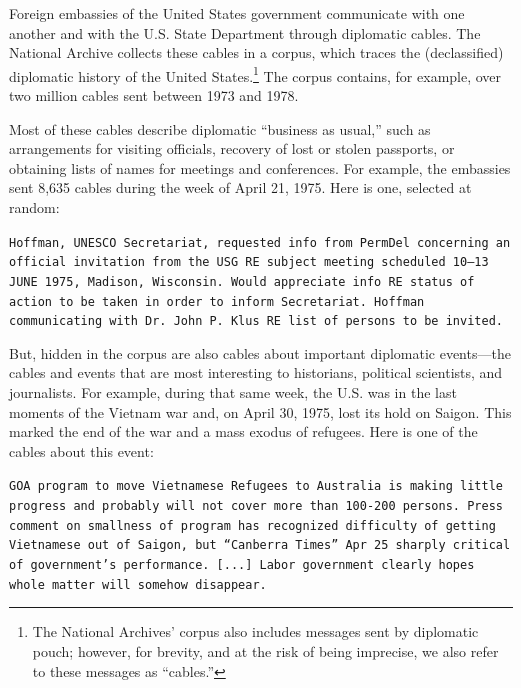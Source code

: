 
Foreign embassies of the United States government communicate with one
another and with the U.S. State Department through diplomatic cables.
The National Archive collects these cables in a corpus, which traces
the (declassified) diplomatic history of the United States.\footnote{
  The National Archives' corpus also includes messages sent by
  diplomatic pouch; however, for brevity, and at the risk of being
  imprecise, we also refer to these messages as
  ``cables.''}  The corpus contains, for example, over two million
cables sent between 1973 and 1978.

Most of these cables describe diplomatic ``business as usual,'' such
as arrangements for visiting officials, recovery of lost or stolen
passports, or obtaining lists of names for meetings and
conferences. For example, the embassies sent 8,635 cables during the
week of April 21, 1975. Here is one, selected at random:
\begin{shaded*} \tt{Hoffman, UNESCO Secretariat, requested info from
PermDel concerning an official invitation from the USG
RE subject meeting scheduled 10--13 JUNE 1975, Madison,
Wisconsin.  Would appreciate info RE status of action to
be taken in order to inform Secretariat.  Hoffman communicating
with Dr.~John P.~Klus RE list of persons to be invited.}
\end{shaded*}

But, hidden in the corpus are also cables about important diplomatic
events---the cables and events that are most interesting to
historians, political scientists, and journalists. For example, during
that same week, the U.S. was in the last moments of the Vietnam war
and, on April 30, 1975, lost its hold on Saigon. This marked the
end of the war and a mass exodus of refugees. Here is one of the cables
about this event:
\begin{shaded*}
  \tt{GOA program to move Vietnamese Refugees to Australia
  is making little progress and probably will not cover more than
  100-200 persons.  Press comment on smallness of program has
  recognized difficulty of getting Vietnamese out of Saigon, but
  ``Canberra Times'' Apr 25 sharply critical of government's
  performance.  [...]
  Labor government clearly hopes whole
  matter will somehow disappear.}
\end{shaded*}

